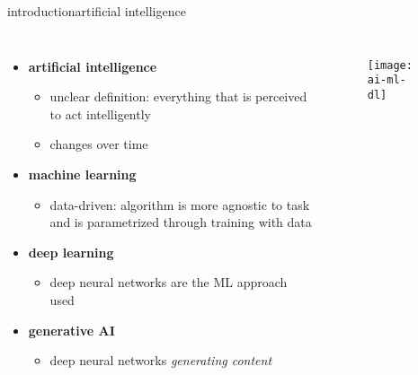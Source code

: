 

\begin{frame}{introduction}{artificial intelligence}
    \vspace{-5mm}
    \begin{columns}
        \begin{itemize}
            \item \textbf{artificial intelligence}
                \begin{itemize}
                    \item   unclear definition: everything that is perceived to act intelligently
                    \item   changes over time
                \end{itemize}
            \bigskip
            \item \textbf{machine learning}
                \begin{itemize}
                    \item   data-driven: algorithm is more agnostic to task and is parametrized through training with data
                \end{itemize}
            \bigskip
            \item   \textbf{deep learning}
                \begin{itemize}
                    \item deep neural networks are the ML approach used
                \end{itemize}
            \bigskip
            \item   \textbf{generative AI}
                \begin{itemize}
                    \item deep neural networks \textit{generating content}
                \end{itemize}
        \end{itemize}
        \begin{figure}%
            \texttt{[image: ai-ml-dl]}%
        \end{figure}
    \end{columns}
\end{frame}

